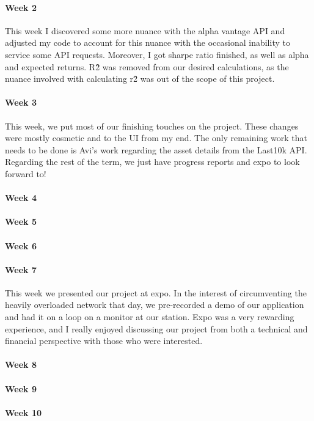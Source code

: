 \documentclass{article}
\begin{document}
\paragraph{Week 2}
This week I discovered some more nuance with the alpha vantage API and adjusted my code to account for this nuance with the occasional inability to service some API requests. Moreover, I got sharpe ratio finished, as well as alpha and expected returns. R\^2 was removed from our desired calculations, as the nuance involved with calculating r\^2 was out of the scope of this project.
\paragraph{Week 3}
This week, we put most of our finishing touches on the project. These changes were mostly cosmetic and to the UI from my end. The only remaining work that needs to be done is Avi's work regarding the asset details from the Last10k API. Regarding the rest of the term, we just have progress reports and expo to look forward to!
\paragraph{Week 4}
\paragraph{Week 5}
\paragraph{Week 6}
\paragraph{Week 7}
This week we presented our project at expo. In the interest of circumventing the heavily overloaded network that day, we pre-recorded a demo of our application and had it on a loop on a monitor at our station. Expo was a very rewarding experience, and I really enjoyed discussing our project from both a technical and financial perspective with those who were interested.
\paragraph{Week 8}
\paragraph{Week 9}
\paragraph{Week 10}
\end{document}
